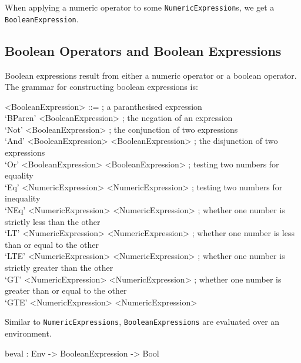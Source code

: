         When applying a numeric operator to some \texttt{NumericExpression}s, we get a \texttt{BooleanExpression}.
    
    \subsection{Boolean Operators and Boolean Expressions}
        Boolean expressions result from either a numeric operator or a boolean operator. The grammar for constructing boolean expressions is:
        \setlength{\grammarindent}{11em}
        \begin{grammar}
            <BooleanExpression>
            ::=  ; a paranthesised expression\\
            `BParen' <BooleanExpression>
            \alt ; the negation of an expression\\
            `Not' <BooleanExpression>
            \alt ; the conjunction of two expressions\\
            `And' <BooleanExpression> <BooleanExpression>
            \alt ; the disjunction of two expressions\\
            `Or' <BooleanExpression> <BooleanExpression>
            \alt ; testing two numbers for equality\\
            `Eq' <NumericExpression> <NumericExpression>
            \alt ; testing two numbers for inequality\\
            `NEq' <NumericExpression> <NumericExpression>
            \alt ; whether one number is strictly less than the other\\
            `LT' <NumericExpression> <NumericExpression>
            \alt ; whether one number is less than or equal to the other\\
            `LTE' <NumericExpression> <NumericExpression>
            \alt ; whether one number is strictly greater than the other\\
            `GT' <NumericExpression> <NumericExpression>
            \alt ; whether one number is greater than or equal to the other\\
            `GTE' <NumericExpression> <NumericExpression>
        \end{grammar}
        Similar to \texttt{NumericExpressions}, \texttt{BooleanExpressions} are evaluated over an environment.
        \begin{code}[caption={The type of the \texttt{beval} function}]
            beval : Env -> BooleanExpression -> Bool
        \end{code}
